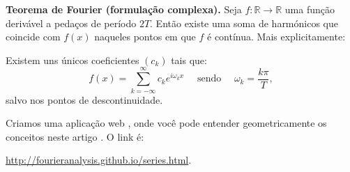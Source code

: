 \begin{mybox}

\textbf{Teorema de Fourier (formulação complexa).} Seja $f:\mathbb{R}\rightarrow \mathbb{R}$ uma função derivável a pedaços de período $2T$. Então existe uma soma de harmónicos que coincide com $f(x)$ naqueles pontos em que $f$ é contínua. Mais explicitamente:

Existem uns únicos coeficientes  $(c_k)$ tais que:
  \begin{equation} \label{eq:RepresentacionFourier3}
    f(x) = \sum_{k=-\infty}^\infty c_ke^{i\omega_k x}\quad \text{ sendo }\quad \omega_k = \frac{k \pi}{T},
  \end{equation}
salvo nos pontos de descontinuidade.
\end{mybox}

\begin{mybox}
\begin{mybox}
Criamos uma aplicação web , onde você pode entender geometricamente os conceitos neste artigo . O link é:

\url{http://fourieranalysis.github.io/series.html}.
\end{mybox}
\end{mybox}



\newpage



